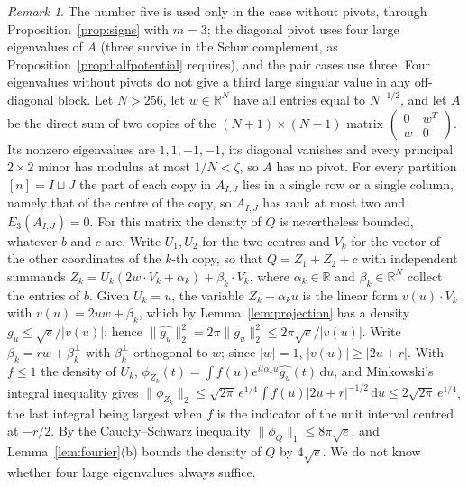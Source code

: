 \documentclass[11pt]{amsart}
\numberwithin{equation}{section}
\theoremstyle{definition}
\theoremstyle{remark}
\newtheorem{remark}[theorem]{Remark}
\newcommand{\R}{\mathbb R}
\newcommand{\1}{\mathbf 1}
\newcommand{\dd}{\,\mathrm d}
\newcommand{\norm}[1]{\lVert #1\rVert}
\newcommand{\abs}[1]{\lvert #1\rvert}
\begin{document}
\begin{remark}\label{rem:four}
The number five is used only in the case without pivots, through Proposition~\ref{prop:signs} with $m=3$; the diagonal pivot uses four large eigenvalues of $A$ (three survive in the Schur complement, as Proposition~\ref{prop:halfpotential} requires), and the pair cases use three. Four eigenvalues without pivots do not give a third large singular value in any off-diagonal block. Let $N>256$, let $w\in\R^N$ have all entries equal to $N^{-1/2}$, and let $A$ be the direct sum of two copies of the $(N+1)\times(N+1)$ matrix $\begin{pmatrix}0&w^T\\w&0\end{pmatrix}$. Its nonzero eigenvalues are $1,1,-1,-1$, its diagonal vanishes and every principal $2\times2$ minor has modulus at most $1/N<\zeta$, so $A$ has no pivot. For every partition $[n]=I\sqcup J$ the part of each copy in $A_{I,J}$ lies in a single row or a single column, namely that of the centre of the copy, so $A_{I,J}$ has rank at most two and $E_3(A_{I,J})=0$. For this matrix the density of $Q$ is nevertheless bounded, whatever $b$ and $c$ are. Write $U_1,U_2$ for the two centres and $V_k$ for the vector of the other coordinates of the $k$-th copy, so that $Q=Z_1+Z_2+c$ with independent summands $Z_k=U_k(2w\cdot V_k+\alpha_k)+\beta_k\cdot V_k$, where $\alpha_k\in\R$ and $\beta_k\in\R^N$ collect the entries of $b$. Given $U_k=u$, the variable $Z_k-\alpha_ku$ is the linear form $v(u)\cdot V_k$ with $v(u)=2uw+\beta_k$, which by Lemma~\ref{lem:projection} has a density $g_u\le\sqrt e/\abs{v(u)}$; hence $\norm{\widehat{g_u}}_2^2=2\pi\norm{g_u}_2^2\le2\pi\sqrt e/\abs{v(u)}$. Write $\beta_k=rw+\beta_k^\perp$ with $\beta_k^\perp$ orthogonal to $w$; since $\abs w=1$, $\abs{v(u)}\ge\abs{2u+r}$. With $f\le1$ the density of $U_k$, $\phi_{Z_k}(t)=\int f(u)e^{it\alpha_ku}\widehat{g_u}(t)\dd u$, and Minkowski's integral inequality gives $\norm{\phi_{Z_k}}_2\le\sqrt{2\pi}\,e^{1/4}\int f(u)\abs{2u+r}^{-1/2}\dd u\le2\sqrt{2\pi}\,e^{1/4}$, the last integral being largest when $f$ is the indicator of the unit interval centred at $-r/2$. By the Cauchy--Schwarz inequality $\norm{\phi_Q}_1\le8\pi\sqrt e$, and Lemma~\ref{lem:fourier}(b) bounds the density of $Q$ by $4\sqrt e$. We do not know whether four large eigenvalues always suffice.
\end{remark}
\end{document}
